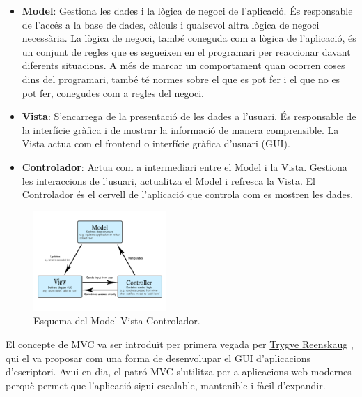 \documentclass{ieeetj}
\begin{document}
\begin{itemize}
    \item \textbf{Model}: Gestiona les dades i la lògica de negoci de l'aplicació. És responsable de l'accés a la base de dades, càlculs i qualsevol altra lògica de negoci necessària. La lògica de negoci, també coneguda com a lògica de l'aplicació, és un conjunt de regles que es segueixen en el programari per reaccionar davant diferents situacions. A més de marcar un comportament quan ocorren coses dins del programari, també té normes sobre el que es pot fer i el que no es pot fer, conegudes com a regles del negoci.
    \item \textbf{Vista}: S'encarrega de la presentació de les dades a l'usuari. És responsable de la interfície gràfica i de mostrar la informació de manera comprensible. La Vista actua com el frontend o interfície gràfica d'usuari (GUI).
    \item \textbf{Controlador}: Actua com a intermediari entre el Model i la Vista. Gestiona les interaccions de l'usuari, actualitza el Model i refresca la Vista. El Controlador és el cervell de l'aplicació que controla com es mostren les dades.
\end{itemize}

\begin{figure}[htbp]
\centerline{\includegraphics[width=0.45\textwidth]{png/MVC.png}}
\caption{Esquema del Model-Vista-Controlador.}
\label{fig:mvc}
\end{figure}

El concepte de MVC va ser introduït per primera vegada per \href{https://en.wikipedia.org/wiki/Trygve_Reenskaug}{Trygve Reenskaug}
, qui el va proposar com una forma de desenvolupar el GUI d'aplicacions d'escriptori. Avui en dia, el patró MVC s'utilitza per a aplicacions web modernes perquè permet que l'aplicació sigui escalable, mantenible i fàcil d'expandir.
\end{document}
